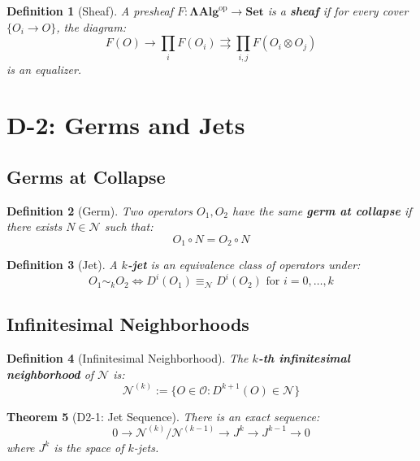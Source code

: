 \documentclass[12pt, oneside]{article}
\newtheorem{theorem}{Theorem}[section]
\newtheorem{definition}[theorem]{Definition}
\newcommand{\N}{\mathcal{N}}
\newcommand{\Opr}{\mathcal{O}}
\begin{document}
\begin{definition}[Sheaf]
A presheaf $F: \mathbf{ΛAlg}^{\text{op}} \rightarrow \mathbf{Set}$ is a \textbf{sheaf} if for every cover $\{O_i \rightarrow O\}$, the diagram:
\begin{equation}
F(O) \rightarrow \prod_i F(O_i) \rightrightarrows \prod_{i,j} F(O_i \otimes O_j)
\end{equation}
is an equalizer.
\end{definition}

\section{D-2: Germs and Jets}

\subsection{Germs at Collapse}

\begin{definition}[Germ]
Two operators $O_1, O_2$ have the same \textbf{germ at collapse} if there exists $N \in \N$ such that:
\begin{equation}
O_1 \circ N = O_2 \circ N
\end{equation}
\end{definition}

\begin{definition}[Jet]
A \textbf{$k$-jet} is an equivalence class of operators under:
\begin{equation}
O_1 \sim_k O_2 \Longleftrightarrow D^i(O_1) \equiv_\N D^i(O_2) \text{ for } i = 0, \ldots, k
\end{equation}
\end{definition}

\subsection{Infinitesimal Neighborhoods}

\begin{definition}[Infinitesimal Neighborhood]
The \textbf{$k$-th infinitesimal neighborhood} of $\N$ is:
\begin{equation}
\N^{(k)} := \{ O \in \Opr : D^{k+1}(O) \in \N \}
\end{equation}
\end{definition}

\begin{theorem}[D2-1: Jet Sequence]
There is an exact sequence:
\begin{equation}
0 \rightarrow \N^{(k)}/\N^{(k-1)} \rightarrow J^k \rightarrow J^{k-1} \rightarrow 0
\end{equation}
where $J^k$ is the space of $k$-jets.
\end{theorem}
\end{document}
